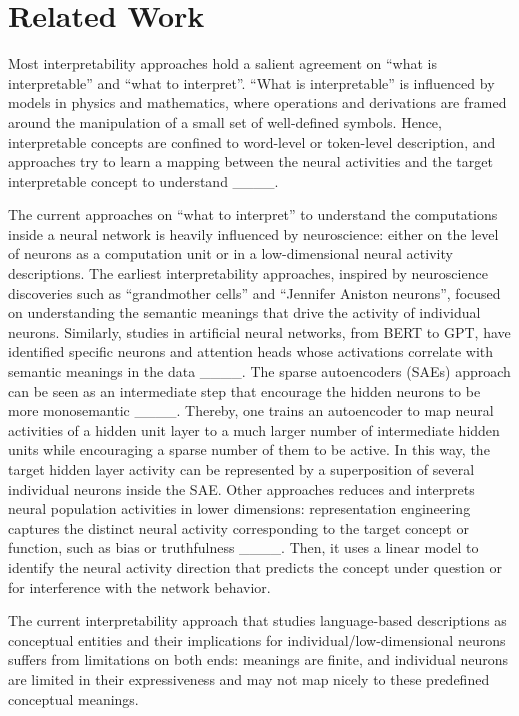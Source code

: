 \section{Related Work}
Most interpretability approaches hold a salient agreement on ``what is interpretable'' and ``what to interpret''. ``What is interpretable'' is influenced by models in physics and mathematics, where operations and derivations are framed around the manipulation of a small set of well-defined symbols. Hence, interpretable concepts are confined to word-level or token-level description, and approaches try to learn a mapping between the neural activities and the target interpretable concept to understand ____. %

The current approaches on ``what to interpret'' to understand the computations inside a neural network is heavily influenced by neuroscience: either on the level of neurons as a computation unit or in a low-dimensional neural activity descriptions. The earliest interpretability approaches, inspired by neuroscience discoveries such as ``grandmother cells'' and ``Jennifer Aniston neurons'', focused on understanding the semantic meanings that drive the activity of individual neurons. Similarly, studies in artificial neural networks, from BERT to GPT, have identified specific neurons and attention heads whose activations correlate with semantic meanings in the data ____. The sparse autoencoders (SAEs) approach can be seen as an intermediate step that encourage the hidden neurons to be more monosemantic ____. Thereby, one trains an autoencoder to map neural activities of a hidden unit layer to a much larger number of intermediate hidden units while encouraging a sparse number of them to be active. In this way, the target hidden layer activity can be represented by a superposition of several individual neurons inside the SAE. 
Other approaches reduces and interprets neural population activities in lower dimensions: representation engineering  captures the distinct neural activity corresponding to the target concept or function, such as bias or truthfulness ____. Then, it uses a linear model to identify the neural activity direction that predicts the concept under question or for interference with the network behavior. 

The current interpretability approach that studies language-based descriptions as conceptual entities and their implications for individual/low-dimensional neurons suffers from limitations on both ends: meanings are finite, and individual neurons are limited in their expressiveness and may not map nicely to these predefined conceptual meanings. 

